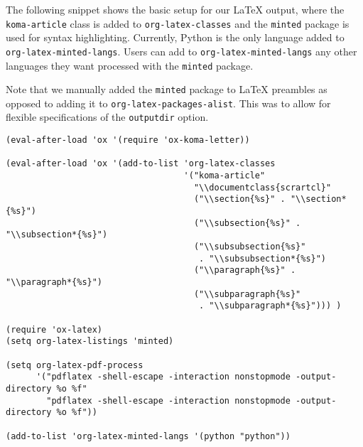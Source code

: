 \documentclass[10pt,article]{article}
\begin{document}
The following snippet shows the basic setup for our \LaTeX{} output,
where the \texttt{koma-article} class is added to \texttt{org-latex-classes} and the
\texttt{minted} package is used for syntax highlighting. Currently, Python is
the only language added to \texttt{org-latex-minted-langs}. Users can add to
\texttt{org-latex-minted-langs} any other languages they want processed with
the \texttt{minted} package.

\begin{mdframed}
Note that we manually added the \texttt{minted} package to \LaTeX{} preambles as opposed to adding
it to \texttt{org-latex-packages-alist}. This was to allow for flexible specifications of the \texttt{outputdir} option.
\end{mdframed}

{\small
\begin{verbatim}
(eval-after-load 'ox '(require 'ox-koma-letter))

(eval-after-load 'ox '(add-to-list 'org-latex-classes
                                   '("koma-article"
                                     "\\documentclass{scrartcl}"
                                     ("\\section{%s}" . "\\section*{%s}")
                                     ("\\subsection{%s}" . "\\subsection*{%s}")
                                     ("\\subsubsection{%s}"
                                      . "\\subsubsection*{%s}")
                                     ("\\paragraph{%s}" . "\\paragraph*{%s}")
                                     ("\\subparagraph{%s}"
                                      . "\\subparagraph*{%s}"))) )

(require 'ox-latex)
(setq org-latex-listings 'minted)

(setq org-latex-pdf-process
      '("pdflatex -shell-escape -interaction nonstopmode -output-directory %o %f"
        "pdflatex -shell-escape -interaction nonstopmode -output-directory %o %f"))

(add-to-list 'org-latex-minted-langs '(python "python"))
\end{verbatim}
}
\end{document}
